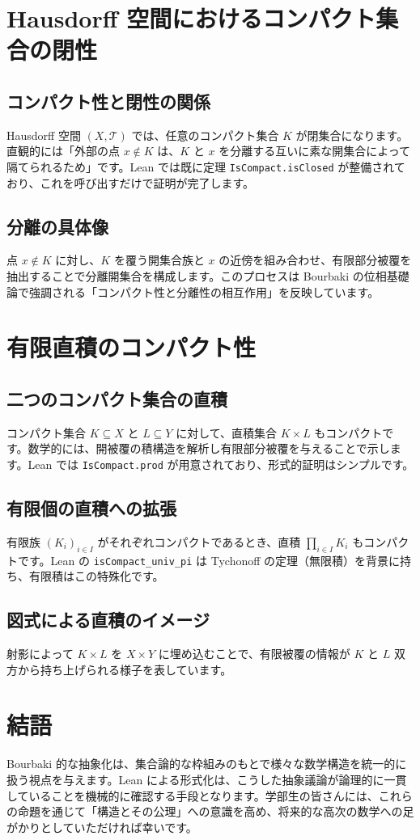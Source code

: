 \documentclass[10pt]{ltjsarticle}
\begin{document}
\section{Hausdorff 空間におけるコンパクト集合の閉性}
\subsection{コンパクト性と閉性の関係}
Hausdorff 空間 $(X,\mathcal{T})$ では、任意のコンパクト集合 $K$ が閉集合になります。直観的には「外部の点 $x \notin K$ は、$K$ と $x$ を分離する互いに素な開集合によって隔てられるため」です。Lean では既に定理 \verb|IsCompact.isClosed| が整備されており、これを呼び出すだけで証明が完了します。

\subsection{分離の具体像}
点 $x \notin K$ に対し、$K$ を覆う開集合族と $x$ の近傍を組み合わせ、有限部分被覆を抽出することで分離開集合を構成します。このプロセスは Bourbaki の位相基礎論で強調される「コンパクト性と分離性の相互作用」を反映しています。

\section{有限直積のコンパクト性}
\subsection{二つのコンパクト集合の直積}
コンパクト集合 $K \subseteq X$ と $L \subseteq Y$ に対して、直積集合 $K \times L$ もコンパクトです。数学的には、開被覆の積構造を解析し有限部分被覆を与えることで示します。Lean では \verb|IsCompact.prod| が用意されており、形式的証明はシンプルです。

\subsection{有限個の直積への拡張}
有限族 $(K_i)_{i \in I}$ がそれぞれコンパクトであるとき、直積 $\prod_{i \in I} K_i$ もコンパクトです。Lean の \verb|isCompact_univ_pi| は Tychonoff の定理（無限積）を背景に持ち、有限積はこの特殊化です。

\subsection{図式による直積のイメージ}

\noindent
射影によって $K \times L$ を $X \times Y$ に埋め込むことで、有限被覆の情報が $K$ と $L$ 双方から持ち上げられる様子を表しています。

\section{結語}
Bourbaki 的な抽象化は、集合論的な枠組みのもとで様々な数学構造を統一的に扱う視点を与えます。Lean による形式化は、こうした抽象議論が論理的に一貫していることを機械的に確認する手段となります。学部生の皆さんには、これらの命題を通じて「構造とその公理」への意識を高め、将来的な高次の数学への足がかりとしていただければ幸いです。
\end{document}
